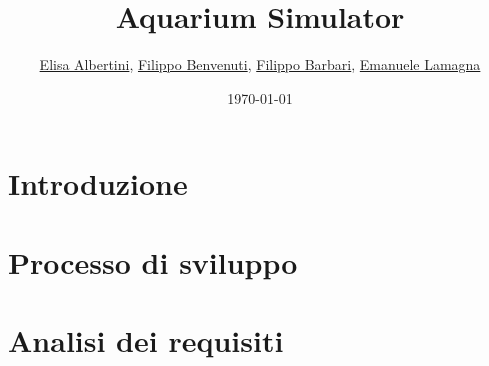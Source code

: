\documentclass[12pt,a4paper,oneside,article]{article}
\title{Aquarium Simulator}
\author{
	\href{mailto:filippo.barbari@studio.unibo.it}{Elisa Albertini},
	\href{mailto:filippo.barbari@studio.unibo.it}{Filippo Benvenuti},
	\href{mailto:filippo.barbari@studio.unibo.it}{Filippo Barbari},
	\href{mailto:filippo.barbari@studio.unibo.it}{Emanuele Lamagna}
}
\date{\today}
\begin{document}
	\maketitle
	
	\tableofcontents
	\clearpage

    \section{Introduzione}
    
    \section{Processo di sviluppo}
    
    \section{Analisi dei requisiti}
\end{document}
